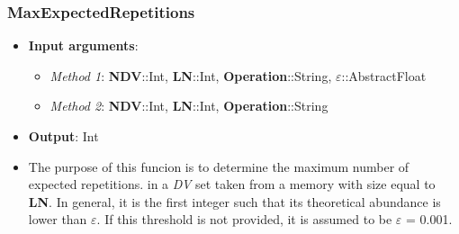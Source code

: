 \subsubsection*{MaxExpectedRepetitions}\label{Subsec:MaxExpectedRepetitions}
%
\begin{itemize}
	\item \textbf{Input arguments}: 
	\begin{itemize}
		\item \textit{Method 1}: \textbf{NDV}::Int, \textbf{LN}::Int, \textbf{Operation}::String, \(\varepsilon\)::AbstractFloat	
		\item \textit{Method 2}: \textbf{NDV}::Int, \textbf{LN}::Int, \textbf{Operation}::String
	\end{itemize}
	\item \textbf{Output}: Int
	\item The purpose of this funcion is to determine the maximum number of expected
	repetitions. in a \textit{DV} set taken from a memory with size equal to \textbf{LN}.
	In general, it is the first integer such that its theoretical abundance is
	lower than \(\varepsilon\). If this threshold is not provided, it is assumed to be \(\varepsilon\) = 0.001.
\end{itemize}
%
